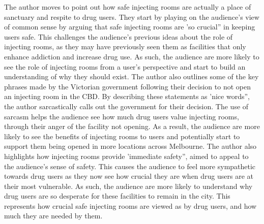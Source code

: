 \documentclass[a4paper]{article}
\begin{document}
The author moves to point out how safe injecting rooms are actually a place of sanctuary and respite to drug users. They start by playing on the audience’s view of common sense by arguing that safe injecting rooms are 'so crucial” in keeping users safe. This challenges the audience’s previous ideas about the role of injecting rooms, as they may have previously seen them as facilities that only enhance addiction and increase drug use. As such, the audience are more likely to see the role of injecting rooms from a user’s perspective and start to build an understanding of why they should exist. The author also outlines some of the key phrases made by the Victorian government following their decision to not open an injecting room in the CBD. By describing these statements as 'nice words”, the author sarcastically calls out the government for their decision. The use of sarcasm helps the audience see how much drug users value injecting rooms, through their anger of the facility not opening. As a result, the audience are more likely to see the benefits of injecting rooms to users and potentially start to support them being opened in more locations across Melbourne. The author also highlights how injecting rooms provide 'immediate safety”, aimed to appeal to the audience’s sense of safety. This causes the audience to feel more sympathetic towards drug users as they now see how crucial they are when drug users are at their most vulnerable. As such, the audience are more likely to understand why drug users are so desperate for these facilities to remain in the city. This represents how crucial safe injecting rooms are viewed as by drug users, and how much they are needed by them.\\
\end{document}
